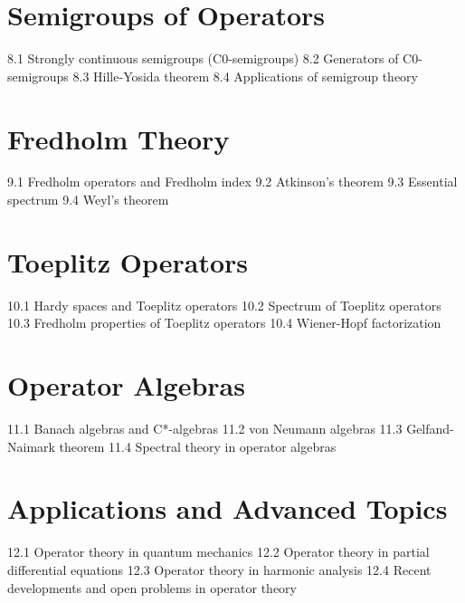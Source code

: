 \section{Semigroups of Operators}
8.1 Strongly continuous semigroups (C0-semigroups)
8.2 Generators of C0-semigroups
8.3 Hille-Yosida theorem
8.4 Applications of semigroup theory
\section{Fredholm Theory}
9.1 Fredholm operators and Fredholm index
9.2 Atkinson's theorem
9.3 Essential spectrum
9.4 Weyl's theorem
\section{Toeplitz Operators}
10.1 Hardy spaces and Toeplitz operators
10.2 Spectrum of Toeplitz operators
10.3 Fredholm properties of Toeplitz operators
10.4 Wiener-Hopf factorization
\section{Operator Algebras}
11.1 Banach algebras and C*-algebras
11.2 von Neumann algebras
11.3 Gelfand-Naimark theorem
11.4 Spectral theory in operator algebras
\section{Applications and Advanced Topics}
12.1 Operator theory in quantum mechanics
12.2 Operator theory in partial differential equations
12.3 Operator theory in harmonic analysis
12.4 Recent developments and open problems in operator theory
